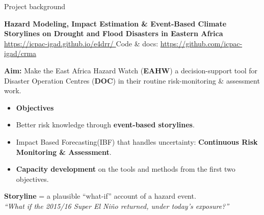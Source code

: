 \documentclass[aspectratio=3218]{beamer}
\begin{document}
\begin{frame}{Project background}
	\begin{block}{}
		\centering\small\textbf{Hazard Modeling, Impact Estimation \& Event-Based
		Climate Storylines on Drought and Flood Disasters in Eastern Africa} \\[0.5ex]
		\footnotesize\url{https://icpac-igad.github.io/e4drr/ }
        \footnotesize{Code \& docs: \url{https://github.com/icpac-igad/crma}}
	\end{block}
	\textbf{Aim:} Make the East Africa Hazard Watch (\textbf{EAHW}) a
	decision-support tool for Disaster Operation Centres (\textbf{DOC}) in their
	routine risk-monitoring \& assessment work.
	\begin{itemize}
		\item[] \textbf{Objectives}
		\item Better risk knowledge through \textbf{event-based storylines}.
		\item Impact Based Forecasting(IBF) that handles uncertainty: \textbf{Continuous Risk Monitoring
			\& Assessment}.
		\item \textbf{Capacity development} on the tools and methods from the
			first two objectives.
	\end{itemize}
	\begin{block}{}
		\textbf{Storyline} = a plausible ``what-if'' account of a hazard event. \\
		\emph{``What if the 2015/16 Super El Ni\~no returned, under today's
		exposure?''}
	\end{block}
\end{frame}
\end{document}
